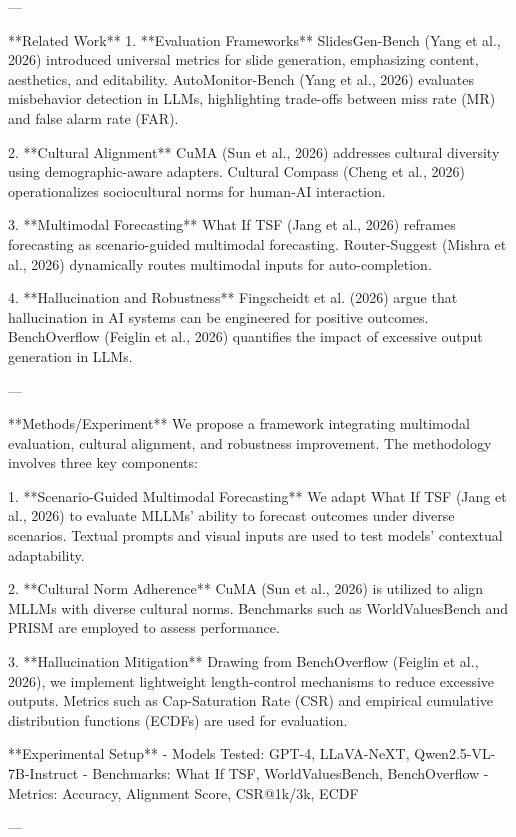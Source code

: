 ---

**Related Work**  
1. **Evaluation Frameworks**  
SlidesGen-Bench (Yang et al., 2026) introduced universal metrics for slide generation, emphasizing content, aesthetics, and editability. AutoMonitor-Bench (Yang et al., 2026) evaluates misbehavior detection in LLMs, highlighting trade-offs between miss rate (MR) and false alarm rate (FAR).

2. **Cultural Alignment**  
CuMA (Sun et al., 2026) addresses cultural diversity using demographic-aware adapters. Cultural Compass (Cheng et al., 2026) operationalizes sociocultural norms for human-AI interaction.

3. **Multimodal Forecasting**  
What If TSF (Jang et al., 2026) reframes forecasting as scenario-guided multimodal forecasting. Router-Suggest (Mishra et al., 2026) dynamically routes multimodal inputs for auto-completion.

4. **Hallucination and Robustness**  
Fingscheidt et al. (2026) argue that hallucination in AI systems can be engineered for positive outcomes. BenchOverflow (Feiglin et al., 2026) quantifies the impact of excessive output generation in LLMs.

---

**Methods/Experiment**  
We propose a framework integrating multimodal evaluation, cultural alignment, and robustness improvement. The methodology involves three key components:

1. **Scenario-Guided Multimodal Forecasting**  
We adapt What If TSF (Jang et al., 2026) to evaluate MLLMs' ability to forecast outcomes under diverse scenarios. Textual prompts and visual inputs are used to test models' contextual adaptability.

2. **Cultural Norm Adherence**  
CuMA (Sun et al., 2026) is utilized to align MLLMs with diverse cultural norms. Benchmarks such as WorldValuesBench and PRISM are employed to assess performance.

3. **Hallucination Mitigation**  
Drawing from BenchOverflow (Feiglin et al., 2026), we implement lightweight length-control mechanisms to reduce excessive outputs. Metrics such as Cap-Saturation Rate (CSR) and empirical cumulative distribution functions (ECDFs) are used for evaluation.

**Experimental Setup**  
- Models Tested: GPT-4, LLaVA-NeXT, Qwen2.5-VL-7B-Instruct  
- Benchmarks: What If TSF, WorldValuesBench, BenchOverflow  
- Metrics: Accuracy, Alignment Score, CSR@1k/3k, ECDF

---

